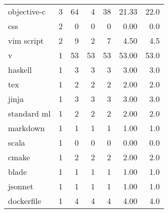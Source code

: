 \begin{tabular}{lrrrrrr}
objective-c      &          3 &          64 &    4 &   38 &  21.33 &     22.0 \\
css              &          2 &           0 &    0 &    0 &   0.00 &      0.0 \\
vim script       &          2 &           9 &    2 &    7 &   4.50 &      4.5 \\
v                &          1 &          53 &   53 &   53 &  53.00 &     53.0 \\
haskell          &          1 &           3 &    3 &    3 &   3.00 &      3.0 \\
tex              &          1 &           2 &    2 &    2 &   2.00 &      2.0 \\
jinja            &          1 &           3 &    3 &    3 &   3.00 &      3.0 \\
standard ml      &          1 &           2 &    2 &    2 &   2.00 &      2.0 \\
markdown         &          1 &           1 &    1 &    1 &   1.00 &      1.0 \\
scala            &          1 &           0 &    0 &    0 &   0.00 &      0.0 \\
cmake            &          1 &           2 &    2 &    2 &   2.00 &      2.0 \\
blade            &          1 &           1 &    1 &    1 &   1.00 &      1.0 \\
jsonnet          &          1 &           1 &    1 &    1 &   1.00 &      1.0 \\
dockerfile       &          1 &           4 &    4 &    4 &   4.00 &      4.0 \\
\bottomrule
\end{tabular}

